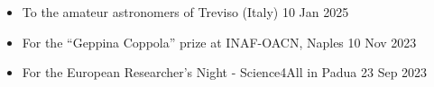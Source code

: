 \begin{experiences}
    {
     \begin{itemize}
         \item To the amateur astronomers of Treviso (Italy) \hfill 10 Jan 2025
         \item For the ``Geppina Coppola'' prize at INAF-OACN, Naples  \hfill 10 Nov 2023 %
         \item For the European Researcher's Night - Science4All in Padua  \hfill 23 Sep 2023
     \end{itemize}}
\end{experiences}